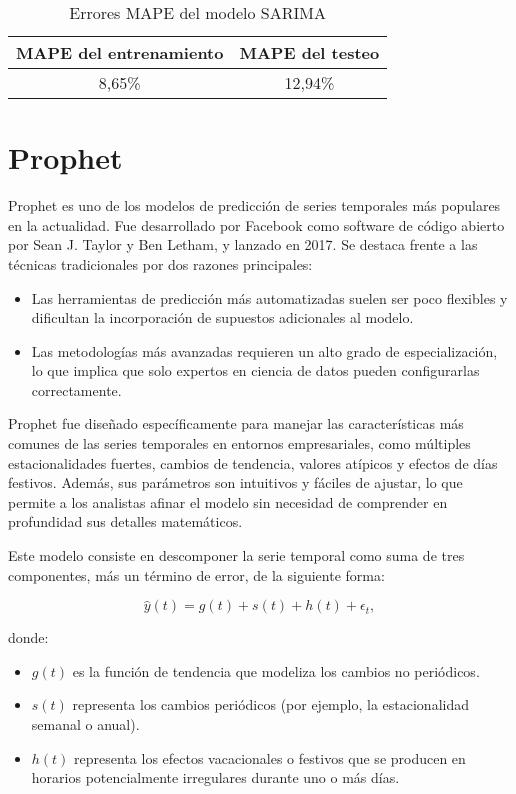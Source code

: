 \documentclass[12pt,twoside]{article}
\begin{document}
\begin{table}[h]
\centering
\begin{tabular}{cc}
\hline
\textbf{MAPE del entrenamiento} & \textbf{MAPE del testeo} \\ \hline
8,65\% & 12,94\% \\ \hline
\end{tabular}
\caption{Errores MAPE del modelo SARIMA}
\label{tab:error1.2}
\end{table}


\newpage
\section{Prophet}\label{sec:1}

Prophet \cite{prophet1} es uno de los modelos de predicción de series temporales más populares en la actualidad. Fue desarrollado por Facebook como software de código abierto por Sean J. Taylor y Ben Letham, y lanzado en 2017. Se destaca frente a las técnicas tradicionales por dos razones principales:

\begin{itemize}
    \item Las herramientas de predicción más automatizadas suelen ser poco flexibles y dificultan la incorporación de supuestos adicionales al modelo.
    \item Las metodologías más avanzadas requieren un alto grado de especialización, lo que implica que solo expertos en ciencia de datos pueden configurarlas correctamente.
\end{itemize}

Prophet fue diseñado específicamente para manejar las características más comunes de las series temporales en entornos empresariales, como múltiples estacionalidades fuertes, cambios de tendencia, valores atípicos y efectos de días festivos. Además, sus parámetros son intuitivos y fáciles de ajustar, lo que permite a los analistas afinar el modelo sin necesidad de comprender en profundidad sus detalles matemáticos.

Este modelo consiste en descomponer la serie temporal como suma de tres componentes, más un término de error, de la siguiente forma:

\begin{equation}
\hat{y}(t) = g(t) + s(t) + h(t) + \epsilon_t,
\end{equation}

donde:

\begin{itemize}
    \item $g(t)$ es la función de tendencia que modeliza los cambios no periódicos.
    \item $s(t)$ representa los cambios periódicos (por ejemplo, la estacionalidad semanal o anual).
    \item $h(t)$ representa los efectos vacacionales o festivos que se producen en horarios potencialmente irregulares durante uno o más días.
\end{itemize}
\end{document}

